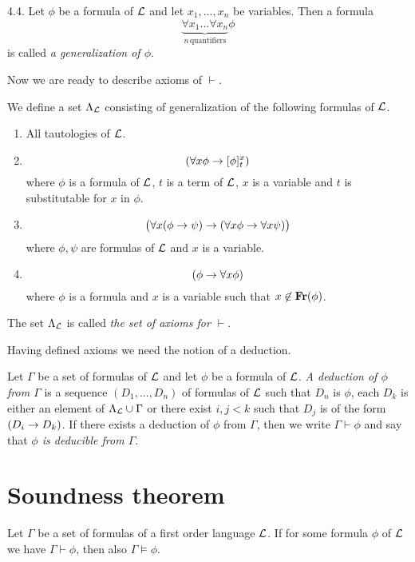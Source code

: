 \begin{definition} 4.4. Let $\phi$ be a formula of ${\mathcal L}$ and let $x_1,...,x_n$ be variables. Then a formula
$$\underbrace{\forall x_1 ...\forall x_n}_{n\,\mathrm{quantifiers}} \phi$$
is called \textit{a generalization of $\phi$}.
\end{definition}
\noindent
Now we are ready to describe axioms of $\vdash$.

\begin{definition}
We define a set $\Lambda_{{\mathcal L}}$ consisting of generalization of the following formulas of ${\mathcal L}$.
\begin{enumerate}[label=\textbf{(\arabic*)}, leftmargin=3.0em]
\item All tautologies of ${\mathcal L}$.
\item
$$\left(\forall x\phi \rightarrow [\phi]^x_t\right)$$
where $\phi$ is a formula of ${\mathcal L}$, $t$ is a term of ${\mathcal L}$, $x$ is a variable and $t$ is substitutable for $x$ in $\phi$.
\item
$$\big(\forall x(\phi \rightarrow \psi) \rightarrow (\forall x\phi \rightarrow \forall x\psi)\big)$$
where $\phi, \psi$ are formulas of ${\mathcal L}$ and $x$ is a variable.
\item
$$(\phi \rightarrow \forall x\phi)$$
where $\phi$ is a formula and $x$ is a variable such that $x \not \in \mathbf{Fr}(\phi)$.
\end{enumerate}
The set $\Lambda_{\mathcal L}$ is called \textit{the set of axioms for $\vdash$}.
\end{definition}
\noindent
Having defined axioms we need the notion of a deduction.

\begin{definition}
Let $\Gamma$ be a set of formulas of ${\mathcal L}$ and let $\phi$ be a formula of ${\mathcal L}$. \textit{A deduction of $\phi$ from $\Gamma$} is a sequence $(D_1 , ..., D_n)$ of formulas of ${\mathcal L}$ such that $D_n$ is $\phi$, each $D_k$ is either an element of $\Lambda_{\mathcal L} \cup \Gamma$ or there exist $i, j < k$ such that $D_j$ is of the form $(D_i \rightarrow D_k)$. If there exists a deduction of $\phi$ from $\Gamma$, then we write $\Gamma \vdash \phi$ and say that \textit{$\phi$ is deducible from $\Gamma$}.
\end{definition}

\section{Soundness theorem}

\begin{theorem}\label{theorem:soundness_theorem}
Let $\Gamma$ be a set of formulas of a first order language ${\mathcal L}$. If for some formula $\phi$ of ${\mathcal L}$ we have $\Gamma \vdash \phi$, then also $\Gamma \vDash \phi$.
\end{theorem}

